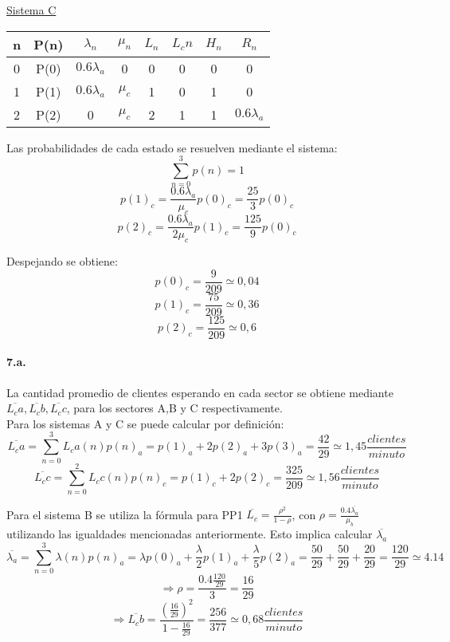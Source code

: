 \documentclass{article}
\begin{document}
 \begin{center}
  \underline{Sistema C} \\ 
    \begin{tabular}{|| c | c | c | c | c | c | c | c ||}
    \hline 
     n & P(n) & $\lambda_n$ & $\mu_n$ & $L_n$& $L_cn$ & $H_n$ & $R_n$ 			\\ \hline \hline
     0 & P(0) & $0.6 \lambda_a$ & 0       & 0    & 0      & 0     & 0			\\ \hline
     1 & P(1) & $0.6 \lambda_a$ & $\mu_c$ & 1    & 0      & 1     & 0	\\ \hline
     2 & P(2) & 0               & $\mu_c$ & 2    & 1      & 1     & $0.6 \lambda_a$ \\ \hline
     
    \end{tabular}
    
    Las probabilidades de cada estado se resuelven mediante el sistema: 
    $$ \sum_{n=0}^{3}p(n) = 1 $$
    $$ p(1)_c = \frac{0.6\lambda_a}{\mu_c} p(0)_c = \frac{25}{3}p(0)_c$$
    $$ p(2)_c = \frac{0.6\lambda_a}{2\mu_c} p(1)_c = \frac{125}{9} p(0)_c$$
    
    Despejando se obtiene: 
    $$ p(0)_c = \frac{9}{209} \simeq 0,04 $$
    $$ p(1)_c = \frac{75}{209} \simeq 0,36 $$
    $$ p(2)_c = \frac{125}{209} \simeq 0,6 $$
    
  \end{center}
  
  \paragraph{7.a.} La cantidad promedio de clientes esperando en cada sector se obtiene mediante $\overline{L_ca}, \overline{L_cb},\overline{L_cc}$, para los sectores A,B y C respectivamente.\\
  Para los sistemas A y C se puede calcular por definición:
  $$\overline{L_ca} = \sum_{n=0}^{3}L_ca(n) p(n)_a = p(1)_a + 2 p(2)_a + 3 p(3)_a = \frac{42}{29} \simeq 1,45 \frac{clientes}{minuto} $$
  $$\overline{L_cc} = \sum_{n=0}^{2}L_cc(n) p(n)_c = p(1)_c + 2 p(2)_c = \frac{325}{209} \simeq 1,56 \frac{clientes}{minuto} $$
  
  Para el sistema B se utiliza la fórmula para PP1 $\overline{L_c} = \frac{\rho^2}{1-\rho}$, con $\rho = \frac{0.4\overline{\lambda_a}}{\mu_b}$ utilizando las igualdades mencionadas anteriormente. Esto implica calcular $\overline{\lambda_a}$
  $$\overline{\lambda_a} = \sum_{n=0}^{3}\lambda(n) p(n)_a = \lambda p(0)_a + \frac{\lambda}{2} p(1)_a + \frac{\lambda}{5} p(2)_a = \frac{50}{29} + \frac{50}{29} + \frac{20}{29} = \frac{120}{29} \simeq 4.14$$
  $$\Rightarrow \rho = \frac{0.4\frac{120}{29}}{3} = \frac{16}{29} $$
  $$\Rightarrow \overline{L_cb} = \frac{(\frac{16}{29})^2}{1-\frac{16}{29}} = \frac{256}{377} \simeq 0,68 \frac{clientes}{minuto} $$
  
\end{document}
